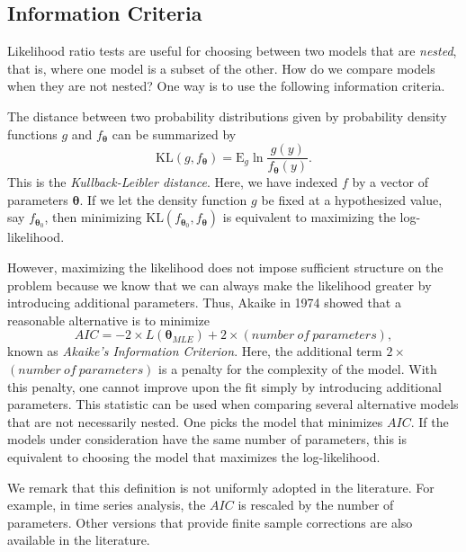 \subsection{Information Criteria}

Likelihood ratio tests are useful for choosing between two models
that are \emph{nested}, that is, where one model is a subset of the
other. How do we compare models when they are not nested? One way is
to use the following information criteria.

The distance between two probability distributions given by
probability density functions $g$ and $f_{\boldsymbol \theta}$ can
be summarized by
\begin{equation*}
\mathrm{KL}(g,f_{\boldsymbol \theta}) = \mathrm{E}_g \ln
\frac{g(y)}{f_{\boldsymbol \theta}(y)} .
\end{equation*}
This is the \emph{Kullback-Leibler distance}. Here, we have indexed
$f$ by a vector of parameters $\boldsymbol \theta$. If we let the
density function $g$ be fixed at a hypothesized value, say
$f_{{\boldsymbol \theta}_0}$, then minimizing
$\mathrm{KL}(f_{{\boldsymbol \theta}_0},f_{\boldsymbol \theta})$ is
equivalent to maximizing the log-likelihood.

However, maximizing the likelihood does not impose sufficient
structure on the problem because we know that we can always make the
likelihood greater by introducing additional parameters. Thus,
Akaike in 1974 showed that a reasonable alternative is to minimize
\begin{equation*}
AIC = -2 \times L(\boldsymbol \theta_{MLE}) + 2 \times
(number~of~parameters),
\end{equation*}
known as \emph{Akaike's Information Criterion}. Here, the additional
term $2 \times $ \newline $(number~of~parameters)$ is a penalty for
the complexity of the model. With this penalty, one cannot improve
upon the fit simply by introducing additional parameters. This
statistic can be used when comparing several alternative models that
are not necessarily nested. One picks the model that minimizes
$AIC$. If the models under consideration have the same number of
parameters, this is equivalent to choosing the model that maximizes
the log-likelihood.

We remark that this definition is not uniformly adopted in the
literature. For example, in time series analysis, the $AIC$ is
rescaled by the number of parameters. Other versions that provide
finite sample corrections are also available in the literature.

